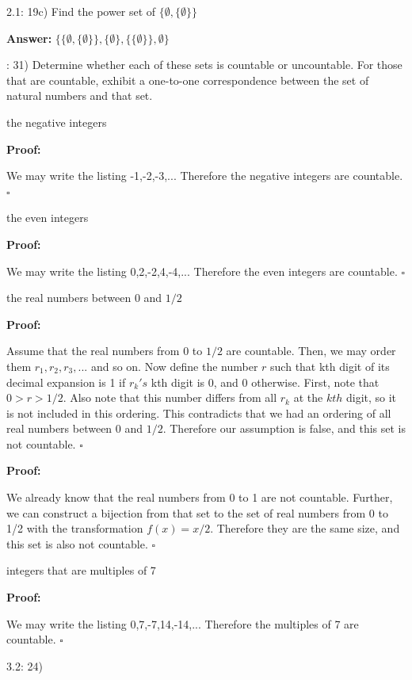 \documentclass{article}
\newenvironment{proof}
{\color{PineGreen}\begin{list}{}%
         {\setlength{\leftmargin}{1cm}}%
         \item[]%
        \textbf{Proof:}
        
        }
{ $\square$\end{list}}
\newenvironment{answer}
{\color{PineGreen}\begin{list}{}%
         {\setlength{\leftmargin}{1cm}}%
         \item[]%
        \textbf{Answer: }}
{\end{list}}
\begin{document}
2.1: 19c) Find the power set of $ \{ \emptyset , \{ \emptyset \} \} $
\begin{answer} $\{\{ \emptyset , \{ \emptyset \} \}, \{ \emptyset \}, \{\{ \emptyset \}\}, \emptyset   \}$\end{answer}
2.4: 31) Determine whether each of these sets is countable or uncountable.  For those that are countable, exhibit a one-to-one correspondence between the set of natural numbers and that set.

\begin{enumerate}[label=\alph{enumi})]
\item the negative integers
\begin{proof} We may write the listing -1,-2,-3,... Therefore the negative integers are countable. \end{proof}
\item the even integers
\begin{proof} We may write the listing 0,2,-2,4,-4,... Therefore the even integers are countable. \end{proof}
\item the real numbers between 0 and $1/2$
\begin{proof} Assume that the real numbers from 0 to $1/2$ are countable. Then, we may order them $r_1,r_2,r_3,...$ and so on. Now define the number $r$ such that kth digit of its decimal expansion is 1 if $r_k's$ kth digit is 0, and 0 otherwise. First, note that $0>r>1/2$. Also note that this number differs from all $r_k$ at the $kth$ digit, so it is not included in this ordering. This contradicts that we had an ordering of all real numbers between 0 and $1/2$. Therefore our assumption is false, and this set is not countable. \end{proof}

\begin{proof} We already know that the real numbers from 0 to 1 are not countable. Further, we can construct a bijection from that set to the set of real numbers from 0 to 1/2 with the transformation $f(x) = x/2$. Therefore they are the same size, and this set is also not countable.\end{proof}
\item integers that are multiples of 7
\begin{proof} We may write the listing 0,7,-7,14,-14,... Therefore the multiples of 7 are countable. \end{proof}
\end{enumerate}

3.2: 24)
\end{document}
